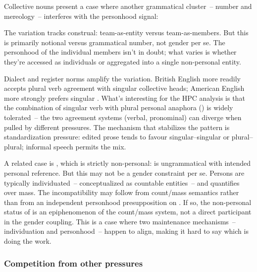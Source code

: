Collective nouns present a case where another grammatical cluster~-- number and mereology~-- interferes with the personhood signal:

\z
{}
\z
The variation tracks construal: team-as-entity versus team-as-members. But this is primarily notional versus grammatical number, not gender per se. The personhood of the individual members isn't in doubt; what varies is whether they're accessed as individuals or aggregated into a single non-personal entity.

Dialect and register norms amplify the variation. British English more readily accepts plural verb agreement with singular collective heads; American English more strongly prefers singular \autocite{bock2006}. What's interesting for the HPC analysis is that the combination of singular verb with plural personal anaphora () is widely tolerated~-- the two agreement systems (verbal, pronominal) can diverge when pulled by different pressures. The mechanism that stabilizes the pattern is standardization pressure: edited prose tends to favour singular--singular or plural--plural; informal speech permits the mix.

A related case is , which is strictly non-personal:  is ungrammatical with intended personal reference. But this may not be a gender constraint per se. Persons are typically individuated~-- conceptualized as countable entities~-- and  quantifies over mass. The incompatibility may follow from count/mass semantics rather than from an independent personhood presupposition on . If so, the non-personal status of  is an epiphenomenon of the count/mass system, not a direct participant in the gender coupling. This is a case where two maintenance mechanisms~-- individuation and personhood~-- happen to align, making it hard to say which is doing the work.

\subsubsection{Competition from other pressures}
\label{sec:12:competition}

